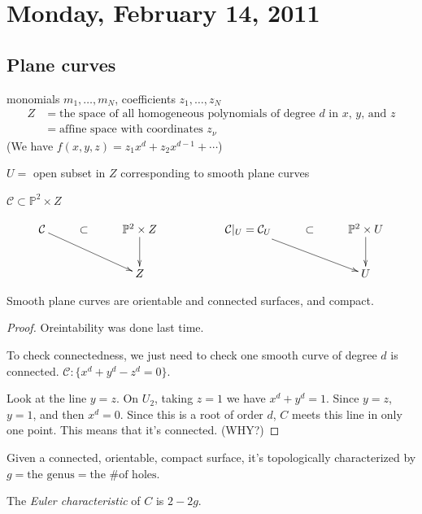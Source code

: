 \documentclass [letterpaper,11pt,twoside] {article}
\begin{document}
\setcounter {section}{4}\section {Monday, February 14, 2011}
  \subsection{Plane curves}
    monomials $m_1, \ldots, m_N$, coefficients $z_1,\ldots, z_N$
    \begin{align*}
      Z & = \text{the space of all homogeneous polynomials of degree $d$ in $x$, $y$, and $z$} \\
        & = \text{affine space with coordinates $z_\nu$}
    \end{align*}
    (We have $f(x, y, z) = z_1x^d + z_2 x^{d-1} + \cdots$)

    $U = $ open subset in $Z$ corresponding to smooth plane curves

    $\mathcal C \subset \mathbb P^2 \times Z$

    $$
    \xymatrix{
    \mathcal C \ar[drr] & \subset & \mathbb P^2 \times Z \ar[d] && \mathcal C|_U = \mathcal C_U \ar[drr] & \subset & \mathbb P^2 \times U \ar[d] \\
                       &         &  Z                           && && U
    }
    $$

    \begin{prop*}
      Smooth plane curves are orientable and connected surfaces, and compact.
    \end{prop*}
    \begin{proof}
      Oreintability was done last time.

      To check connectedness, we just need to check one smooth curve of degree $d$ is connected.  $\mathcal C : \{ x^d + y^d - z^d = 0 \}$.

      Look at the line $y = z$.  On $U_2$, taking $z = 1$ we have $x^d + y^d = 1$.  Since $y = z$, $y = 1$, and then $x^d = 0$.  Since this is a root of order $d$, $C$ meets this line in only one point.  This means that it's connected. (WHY?)
    \end{proof}

    Given a connected, orientable, compact surface, it's topologically characterized by $g = \text{the genus} = \text{the \# of holes}$.

    \begin{defn*}
      The \emph{Euler characteristic} of $C$ is $2 - 2g$.
    \end{defn*}
\end{document}

